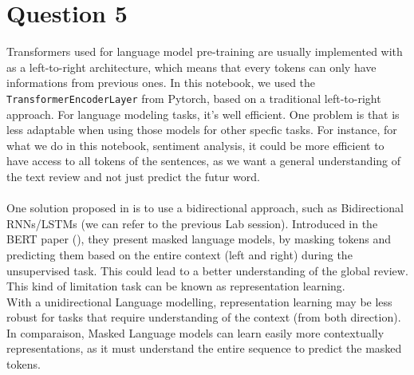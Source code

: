 \documentclass[a4paper]{article}
\begin{document}
\section*{Question 5}
    Transformers used for language model pre-training are usually implemented with as a left-to-right
    architecture, which means that every tokens can only have informations from previous ones.
    In this notebook, we used the \texttt{TransformerEncoderLayer} from Pytorch, based on
    a traditional left-to-right approach. For language modeling tasks, it's well efficient.
    One problem is that is less adaptable when using those models for other specfic tasks. For instance,
    for what we do in this notebook, sentiment analysis, it could be more efficient to
    have access to all tokens of the sentences, as we want a general understanding of the
    text review and not just predict the futur word.\\
    \\
    One solution proposed in \cite{devlin2019bertpretrainingdeepbidirectional} is to use
    a bidirectional approach, such as Bidirectional RNNs/LSTMs (we can refer to the previous Lab session).
    Introduced in the BERT paper (\cite{devlin2019bertpretrainingdeepbidirectional}), they present
    masked language models, by masking tokens and predicting them based on the entire context
    (left and right) during the unsupervised task. This could lead to a better understanding of
    the global review. This kind of limitation task can be known as representation learning.
    \\
    With a unidirectional Language modelling, representation learning may be less robust
    for tasks that require understanding of the context (from both direction). In comparaison,
    Masked Language models can learn easily more contextually representations, as it must
    understand the entire sequence to predict the masked tokens.





\end{document}
